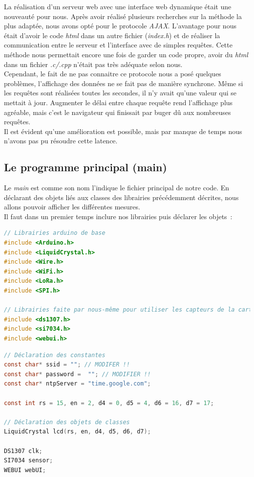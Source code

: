                 La réalisation d'un serveur web avec une interface web dynamique était une nouveauté pour nous. Après avoir réalisé plusieurs recherches sur la méthode la plus adaptée, nous avons opté pour le protocole \textit{AJAX}. L'avantage 
                pour nous était d'avoir le code \textit{html} dans un autre fichier (\textit{index.h}) et de réaliser la communication entre le serveur et l'interface avec de simples requêtes. Cette méthode nous permettait encore une fois de garder un code propre, 
                avoir du \textit{html} dans un fichier \textit{.c/.cpp} n'était pas très adéquate selon nous. \\
                Cependant, le fait de ne pas connaitre ce protocole nous a posé quelques problèmes, l'affichage des données ne se fait pas de manière synchrone. Même si les requêtes sont réalisées toutes les secondes, il n'y avait qu'une valeur qui se mettait à jour. 
                Augmenter le délai entre chaque requête rend l'affichage plus agréable, mais c'est le navigateur qui finissait par buger dû aux nombreuses requêtes. \\ 
                Il est évident qu'une amélioration est possible, mais par manque de temps nous n’avons pas pu résoudre cette latence.




        \subsection{Le programme principal (main)}
        Le \textit{main} est comme son nom l'indique le fichier principal de notre code. En déclarant des objets liés aux classes des librairies précédemment décrites, nous allons pouvoir afficher les différentes mesures. \\

        \noindent
        Il faut dans un premier temps inclure nos librairies puis déclarer les objets~:

\begin{lstlisting}[style=myC, caption=Ajout des librairies, language=C, frame=lines]
// Librairies arduino de base
#include <Arduino.h>
#include <LiquidCrystal.h>
#include <Wire.h>
#include <WiFi.h>
#include <LoRa.h>
#include <SPI.h>

// Librairies faite par nous-même pour utiliser les capteurs de la carte serveur
#include <ds1307.h>
#include <si7034.h>
#include <webui.h>
\end{lstlisting}


\begin{lstlisting}[style=myC, caption=Déclaration des objets et constantes, language=C, frame=lines]
// Déclaration des constantes
const char* ssid = ""; // MODIFER !!
const char* password =  ""; // MODIFIER !!
const char* ntpServer = "time.google.com";

const int rs = 15, en = 2, d4 = 0, d5 = 4, d6 = 16, d7 = 17; 

// Déclaration des objets de classes
LiquidCrystal lcd(rs, en, d4, d5, d6, d7);

DS1307 clk;
SI7034 sensor;
WEBUI webUI;
\end{lstlisting}

